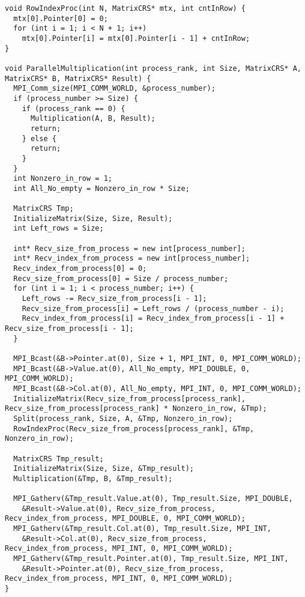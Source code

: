 \documentclass{report}
\begin{document}
\begin{lstlisting}
void RowIndexProc(int N, MatrixCRS* mtx, int cntInRow) {
  mtx[0].Pointer[0] = 0;
  for (int i = 1; i < N + 1; i++)
    mtx[0].Pointer[i] = mtx[0].Pointer[i - 1] + cntInRow;
}

void ParallelMultiplication(int process_rank, int Size, MatrixCRS* A, MatrixCRS* B, MatrixCRS* Result) {
  MPI_Comm_size(MPI_COMM_WORLD, &process_number);
  if (process_number >= Size) {
    if (process_rank == 0) {
      Multiplication(A, B, Result);
      return;
    } else {
      return;
    }
  }
  int Nonzero_in_row = 1;
  int All_No_empty = Nonzero_in_row * Size;

  MatrixCRS Tmp;
  InitializeMatrix(Size, Size, Result);
  int Left_rows = Size;

  int* Recv_size_from_process = new int[process_number];
  int* Recv_index_from_process = new int[process_number];
  Recv_index_from_process[0] = 0;
  Recv_size_from_process[0] = Size / process_number;
  for (int i = 1; i < process_number; i++) {
    Left_rows -= Recv_size_from_process[i - 1];
    Recv_size_from_process[i] = Left_rows / (process_number - i);
    Recv_index_from_process[i] = Recv_index_from_process[i - 1] + Recv_size_from_process[i - 1];
  }

  MPI_Bcast(&B->Pointer.at(0), Size + 1, MPI_INT, 0, MPI_COMM_WORLD);
  MPI_Bcast(&B->Value.at(0), All_No_empty, MPI_DOUBLE, 0, MPI_COMM_WORLD);
  MPI_Bcast(&B->Col.at(0), All_No_empty, MPI_INT, 0, MPI_COMM_WORLD);
  InitializeMatrix(Recv_size_from_process[process_rank], Recv_size_from_process[process_rank] * Nonzero_in_row, &Tmp);
  Split(process_rank, Size, A, &Tmp, Nonzero_in_row);
  RowIndexProc(Recv_size_from_process[process_rank], &Tmp, Nonzero_in_row);

  MatrixCRS Tmp_result;
  InitializeMatrix(Size, Size, &Tmp_result);
  Multiplication(&Tmp, B, &Tmp_result);

  MPI_Gatherv(&Tmp_result.Value.at(0), Tmp_result.Size, MPI_DOUBLE,
    &Result->Value.at(0), Recv_size_from_process, Recv_index_from_process, MPI_DOUBLE, 0, MPI_COMM_WORLD);
  MPI_Gatherv(&Tmp_result.Col.at(0), Tmp_result.Size, MPI_INT,
    &Result->Col.at(0), Recv_size_from_process, Recv_index_from_process, MPI_INT, 0, MPI_COMM_WORLD);
  MPI_Gatherv(&Tmp_result.Pointer.at(0), Tmp_result.Size, MPI_INT,
    &Result->Pointer.at(0), Recv_size_from_process, Recv_index_from_process, MPI_INT, 0, MPI_COMM_WORLD);
}
\end{lstlisting}
\end{document}
